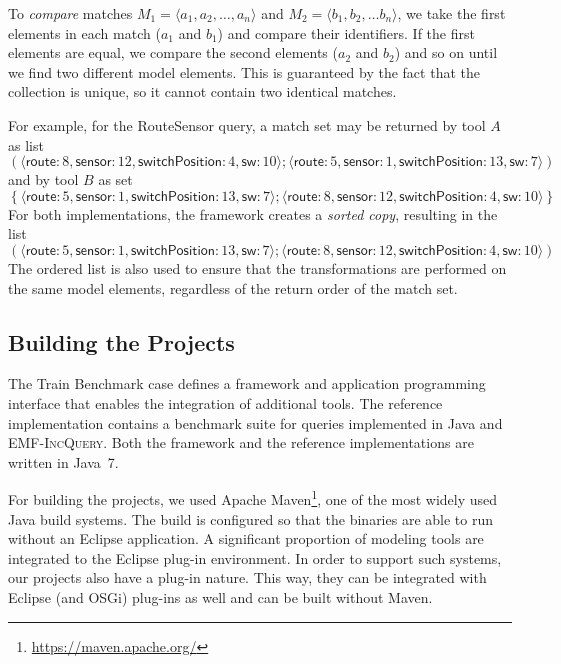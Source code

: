 \documentclass[submission,copyright,creativecommons]{eptcs}
\newcommand{\eiq}{\textsc{EMF-IncQuery}}
\begin{document}
To \emph{compare} matches $M_1 = \langle a_1, a_2, \ldots, a_n \rangle$ and $M_2 = \langle b_1, b_2, \ldots b_n \rangle$, we take the first elements in each match ($a_1$ and $b_1$) and compare their identifiers. If the first elements are equal, we compare the second elements ($a_2$ and $b_2$) and so on until we find two different model elements. This is guaranteed by the fact that the collection is unique, so it cannot contain two identical matches.

For example, for the \textsf{RouteSensor} query, a match set may be returned by tool $A$ as list
\[\left(
\langle\textsf{route}: 8, \textsf{sensor}: 12, \textsf{switchPosition}: 4, \textsf{sw}: 10\rangle;
\langle\textsf{route}: 5, \textsf{sensor}: 1, \textsf{switchPosition}: 13, \textsf{sw}: 7\rangle
\right)\]
and by tool $B$ as set
\[\left\{
\langle\textsf{route}: 5, \textsf{sensor}: 1, \textsf{switchPosition}: 13, \textsf{sw}: 7\rangle;
\langle\textsf{route}: 8, \textsf{sensor}: 12, \textsf{switchPosition}: 4, \textsf{sw}: 10\rangle
\right\}\]
For both implementations, the framework creates a \emph{sorted copy}, resulting in the list
\[\left(
\langle\textsf{route}: 5, \textsf{sensor}: 1, \textsf{switchPosition}: 13, \textsf{sw}: 7\rangle;
\langle\textsf{route}: 8, \textsf{sensor}: 12, \textsf{switchPosition}: 4, \textsf{sw}: 10\rangle
\right)\]
The ordered list is also used to ensure that the transformations are performed on the same model elements, regardless of the return order of the match set.

\subsection{Building the Projects}

The Train Benchmark case defines a framework and application programming interface that enables the integration of additional tools. The reference implementation contains a benchmark suite for queries implemented in Java and \eiq{}. Both the framework and the reference implementations are written in Java~7.

For building the projects, we used Apache Maven\footnote{\url{https://maven.apache.org/}}, one of the most widely used Java build systems. The build is configured so that the binaries are able to run without an Eclipse application. A significant proportion of modeling tools are integrated to the Eclipse plug-in environment. In order to support such systems, our projects also have a plug-in nature. This way, they can be integrated with Eclipse (and OSGi) plug-ins as well and can be built without Maven.
\end{document}
